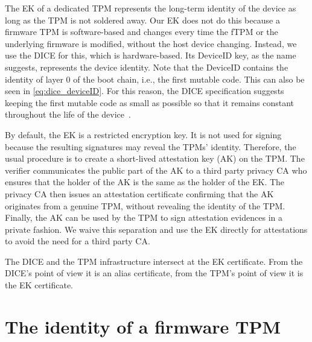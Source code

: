 
The EK of a dedicated TPM represents the long-term identity of the device as long as the TPM is not soldered away.
Our EK does not do this because a firmware TPM is software-based and changes every time the fTPM or the underlying firmware is modified, without the host device changing.
Instead, we use the DICE for this, which is hardware-based.
Its DeviceID key, as the name suggests, represents the device identity.
Note that the DeviceID contains the identity of layer 0 of the boot chain, i.e., the first mutable code.
This can also be seen in \autoref{eq:dice_deviceID}.
For this reason, the DICE specification suggests keeping the first mutable code as small as possible so that it remains constant throughout the life of the device~\cite{dice-layering-arch}.


By default, the EK is a restricted encryption key.
It is not used for signing because the resulting signatures may reveal the TPMs' identity.
Therefore, the usual procedure is to create a short-lived attestation key (AK) on the TPM\@.
The verifier communicates the public part of the AK to a third party privacy CA who ensures that the holder of the AK is the same as the holder of the EK\@.
The privacy CA then issues an attestation certificate confirming that the AK originates from a genuine TPM, without revealing the identity of the TPM\@.
Finally, the AK can be used by the TPM to sign attestation evidences in a private fashion.
We waive this separation and use the EK directly for attestations to avoid the need for a third party CA\@.


The DICE and the TPM infrastructure intersect at the EK certificate.
From the DICE's point of view it is an alias certificate, from the TPM's point of view it is the EK certificate.


\section{The identity of a firmware TPM}


